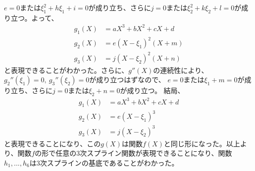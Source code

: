 \documentclass{jsarticle}
\begin{document}
$e=0$または$\xi_1^2+h\xi_1+i=0$が成り立ち、さらに$j=0$または$\xi_2^2+k\xi_2+l=0$が成り立つ。よって、
\begin{align*}
g_1(X)&=a X^3+ b X^2 + c X + d\\
g_2(X)&=e (X-\xi_1)^2(X + m) \\
g_3(X)&=j (X-\xi_2)^2(X + n)
\end{align*}
と表現できることがわかった。さらに、$g''(X)$の連続性により、$g_2''(\xi_1)=0,\ g_3''(\xi_2)=0$が成り立つはずなので、
$e=0$または$\xi_1+m=0$が成り立ち、さらに$j=0$または$\xi_2+n=0$が成り立つ。
結局、
\begin{align*}
g_1(X)&=a X^3+ b X^2 + c X + d\\
g_2(X)&=e (X-\xi_1)^3 \\
g_3(X)&=j (X-\xi_2)^3
\end{align*}
と表現できることになり、この$g(X)$は関数$f(X)$と同じ形になった。以上より、関数$f$の形で任意の3次スプライン関数が表現できることになり、関数$h_1,...,h_6$は3次スプラインの基底であることがわかった。
\end{document}
